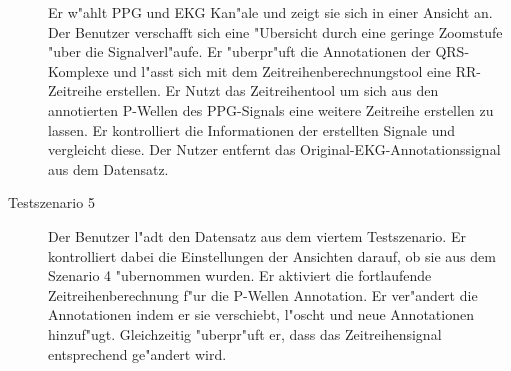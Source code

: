 \begin{description}
					  Er w"ahlt \ac{PPG} und \ac{EKG} Kan"ale und zeigt sie sich in einer Ansicht an.
					  Der Benutzer verschafft sich eine "Ubersicht durch eine geringe Zoomstufe "uber die Signalverl"aufe.
					  Er "uberpr"uft die Annotationen der QRS-Komplexe und l"asst sich mit dem Zeitreihenberechnungstool eine RR-Zeitreihe erstellen.
					  Er Nutzt das Zeitreihentool um sich aus den annotierten P-Wellen des \ac{PPG}-Signals eine weitere Zeitreihe erstellen zu lassen.
					  Er kontrolliert die Informationen der erstellten Signale und vergleicht diese.
					  Der Nutzer entfernt das Original-\ac{EKG}-Annotationssignal aus dem Datensatz.
\item[Testszenario 5] Der Benutzer l"adt den Datensatz aus dem viertem Testszenario.
					  Er kontrolliert dabei die Einstellungen der Ansichten darauf, ob sie aus dem Szenario 4 "ubernommen wurden.
					  Er aktiviert die fortlaufende Zeitreihenberechnung f"ur die P-Wellen Annotation.
					  Er ver"andert die Annotationen indem er sie verschiebt, l"oscht und neue Annotationen hinzuf"ugt.
					  Gleichzeitig "uberpr"uft er, dass das Zeitreihensignal entsprechend ge"andert wird.
\end{description}

